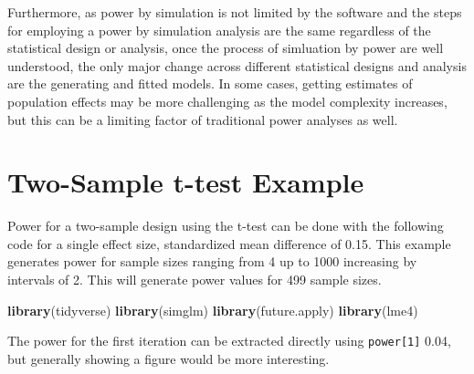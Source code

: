 \documentclass[man]{apa6}
\newenvironment{Shaded}{\begin{snugshade}}{\end{snugshade}}
\newcommand{\ControlFlowTok}[1]{\textcolor[rgb]{0.13,0.29,0.53}{\textbf{#1}}}
\newcommand{\DataTypeTok}[1]{\textcolor[rgb]{0.13,0.29,0.53}{#1}}
\newcommand{\DecValTok}[1]{\textcolor[rgb]{0.00,0.00,0.81}{#1}}
\newcommand{\FloatTok}[1]{\textcolor[rgb]{0.00,0.00,0.81}{#1}}
\newcommand{\KeywordTok}[1]{\textcolor[rgb]{0.13,0.29,0.53}{\textbf{#1}}}
\newcommand{\NormalTok}[1]{#1}
\newcommand{\OperatorTok}[1]{\textcolor[rgb]{0.81,0.36,0.00}{\textbf{#1}}}
\newcommand{\StringTok}[1]{\textcolor[rgb]{0.31,0.60,0.02}{#1}}
\begin{document}
Furthermore, as power by simulation is not limited by the software and the steps for employing a power by simulation analysis are the same regardless of the statistical design or analysis, once the process of simluation by power are well understood, the only major change across different statistical designs and analysis are the generating and fitted models. In some cases, getting estimates of population effects may be more challenging as the model complexity increases, but this can be a limiting factor of traditional power analyses as well.

\hypertarget{two-sample-t-test-example}{%
\section{Two-Sample t-test Example}\label{two-sample-t-test-example}}

Power for a two-sample design using the t-test can be done with the following code for a single effect size, standardized mean difference of 0.15. This example generates power for sample sizes ranging from 4 up to 1000 increasing by intervals of 2. This will generate power values for 499 sample sizes.

\begin{Shaded}
\begin{Highlighting}[]
\KeywordTok{library}\NormalTok{(tidyverse)}
\KeywordTok{library}\NormalTok{(simglm)}
\KeywordTok{library}\NormalTok{(future.apply)}
\KeywordTok{library}\NormalTok{(lme4)}
\end{Highlighting}
\end{Shaded}

\begin{Shaded}
\end{Shaded}

The power for the first iteration can be extracted directly using \texttt{power{[}1{]}} 0.04, but generally showing a figure would be more interesting.
\end{document}
